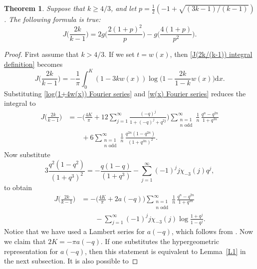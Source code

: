 \documentclass[12pt,reqno]{amsart}
\newtheorem{theorem}{Theorem}
\theoremstyle{remark}
\begin{document}
\begin{theorem}
\label{elliptic-cond-20}
Suppose that $k\ge4/3$, and let $p=\frac12(-1+\sqrt{(3k-1)/(k-1)})$.  The following formula is
true:
\begin{equation}\label{I(k) general integral formula}
J\biggl(\frac{2k}{k-1}\biggr)
=2g\biggl(\frac{2(1+p)^2}{p}\biggr)-g\biggl(\frac{4(1+p)}{p^2}\biggr).
\end{equation}
\end{theorem}

\begin{proof}
First assume that $k>4/3$.  If we set $t=w(x)$, then
\eqref{J(2k/(k-1)) integral definition} becomes
\begin{equation*}
J\biggl(\frac{2k}{k-1}\biggr)
=-\frac{1}{\pi}\int_{0}^{K}(1-3 kw(x))\log\biggl(1-\frac{2k}{1-k}w(x)\biggr){{\mathrm d}} x.
\end{equation*}
Substituting \eqref{log(1+4w(x)) Fourier series} and \eqref{w(x)
Fourier series} reduces the integral to
\begin{equation*}
\begin{split}
J\biggl(\frac{2k}{k-1}\biggr)
&=-\biggl(\frac{4K}{\pi}+12\sum_{j=1}^{\infty}\frac{(-q)^{j}}{1+(-q)^j+q^{2j}}\biggr)
\sum_{\substack{n=1\\\text{$n$ odd}}}^{\infty}\frac{1}{n}\,\frac{q^n-q^{2n}}{1+q^{3n}}
\\ &\qquad
+6\sum_{\substack{n=1\\\text{$n$ odd}}}^{\infty}\frac{1}{n}\,\frac{q^{2n}(1-q^{2n})}{(1+q^{3n})^2}.
\end{split}
\end{equation*}
Now substitute
\begin{equation*}
3\frac{q^2(1-q^2)}{(1+q^3)^2}=-\frac{q(1-q)}{(1+q^3)}-\sum_{j=1}^{\infty}(-1)^j j\chi_{-3}(j)q^j,
\end{equation*}
to obtain
\begin{align*}
J\biggl(\frac{2k}{k-1}\biggr)
&=-\biggl(\frac{4K}{\pi}+2a(-q)\biggr)\sum_{\substack{n=1\\\text{$n$ odd}}}^{\infty}
\frac{1}{n}\,\frac{q^n-q^{2n}}{1+q^{3n}}
\\ &\qquad
-\sum_{j=1}^{\infty}(-1)^jj\chi_{-3}(j)\log\frac{1+q^j}{1-q^j}.
\end{align*}
Notice that we have used a Lambert series for $a(-q)$, which
follows from \cite[pg.~100, Theorem 2.12]{Be5}.  Now we claim that
$2K=-\pi a(-q)$.  If one substitutes the hypergeometric
representation for $a(-q)$, then this statement is equivalent to
Lemma~\ref{L1} in the next subsection.  It is also possible to

\end{proof}
\end{document}
